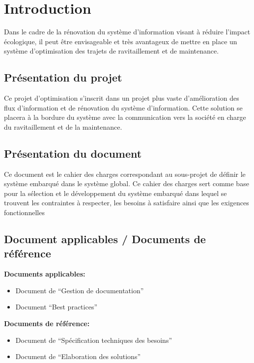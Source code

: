 \newpage
\section{Introduction}

        Dans le cadre de la rénovation du système d'information visant à réduire l'impact écologique, il peut être envisageable et très avantageux de mettre en place un système d'optimisation des trajets de ravitaillement et de maintenance.

    \subsection{Présentation du projet}
    
        Ce projet d'optimisation s'inscrit dans un projet plus vaste d'amélioration des flux d'information et de rénovation du système d'information.
        Cette solution se placera à la bordure du système avec la communication vers la société en charge du ravitaillement et de la maintenance.
        
    \subsection{Présentation du document}
        
	Ce document est le cahier des charges correspondant au  sous-projet de définir le système embarqué dans le système global. 
	Ce cahier des charges sert comme base pour la sélection et le développement du système embarqué dans lequel se trouvent les contraintes à respecter, les besoins à satisfaire ainsi que les exigences fonctionnelles
        
    \subsection{Document applicables / Documents de référence}

		\textbf{Documents applicables:}
			\begin{itemize}
			    \item Document de ``Gestion de documentation''
				 \item Document ``Best practices''
			\end{itemize}

		\textbf{Documents de référence:}
			\begin{itemize}
			    \item Document de ``Spécification techniques des besoins''
				 \item Document de ``Elaboration des solutions''
			\end{itemize}	
    
